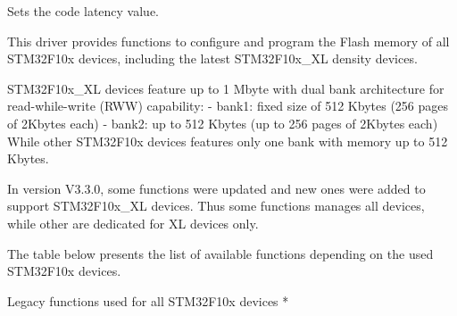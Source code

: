 Sets the code latency value. 


\begin{DoxyCode}
This driver provides functions to configure and program the Flash memory of all STM32F10x devices,
including the latest STM32F10x\_XL density devices. 

STM32F10x\_XL devices feature up to 1 Mbyte with dual bank architecture \textcolor{keywordflow}{for} read-\textcolor{keywordflow}{while}-write (RWW) 
      capability:
   - bank1: fixed size of 512 Kbytes (256 pages of 2Kbytes each)
   - bank2: up to 512 Kbytes (up to 256 pages of 2Kbytes each)
While other STM32F10x devices features only one bank with memory up to 512 Kbytes.

In version V3.3.0, some functions were updated and \textcolor{keyword}{new} ones were added to support
STM32F10x\_XL devices. Thus some functions manages all devices, \textcolor{keywordflow}{while} other are 
dedicated \textcolor{keywordflow}{for} XL devices only.

The table below presents the list of available functions depending on the used STM32F10x devices.  
     
                                                     
    Legacy functions used \textcolor{keywordflow}{for} all STM32F10x devices *
                                                     

\end{DoxyCode}
